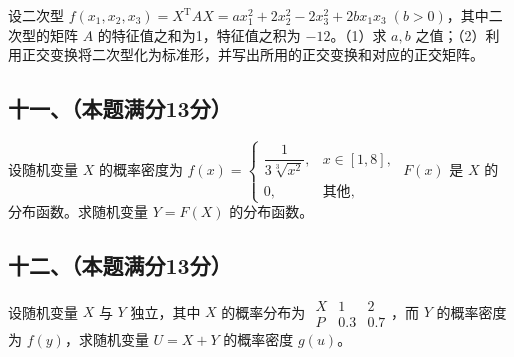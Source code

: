 \documentclass[UTF8,12pt]{ctexart}
\begin{document}
设二次型 \(\displaystyle f(x_1,\allowbreak x_2,\allowbreak x_3)=X^{\mathrm T}AX=ax_1^2+2x_2^2-2x_3^2+2bx_1x_3\;(b>0)\)，其中二次型的矩阵 \(\displaystyle A\) 的特征值之和为1，特征值之积为 \(\displaystyle -12\)。（1）求 \(\displaystyle a,\allowbreak b\) 之值；（2）利用正交变换将二次型化为标准形，并写出所用的正交变换和对应的正交矩阵。


\subsection*{十一、（本题满分13分）}

设随机变量 \(\displaystyle X\) 的概率密度为 \(\displaystyle f(x)=\begin{cases}\dfrac{\displaystyle 1}{\displaystyle 3\sqrt[3]{x^2}},\allowbreak &x\in[1,\allowbreak 8],\allowbreak \\0,\allowbreak &\text{其他},\allowbreak \end{cases}\) \(\displaystyle F(x)\) 是 \(\displaystyle X\) 的分布函数。求随机变量 \(\displaystyle Y=F(X)\) 的分布函数。


\subsection*{十二、（本题满分13分）}

设随机变量 \(\displaystyle X\) 与 \(\displaystyle Y\) 独立，其中 \(\displaystyle X\) 的概率分布为 \(\displaystyle \begin{array}{c|cc}X&1&2\\\hline P&0.3&0.7\end{array}\)，而 \(\displaystyle Y\) 的概率密度为 \(\displaystyle f(y)\)，求随机变量 \(\displaystyle U=X+Y\) 的概率密度 \(\displaystyle g(u)\)。
\end{document}
